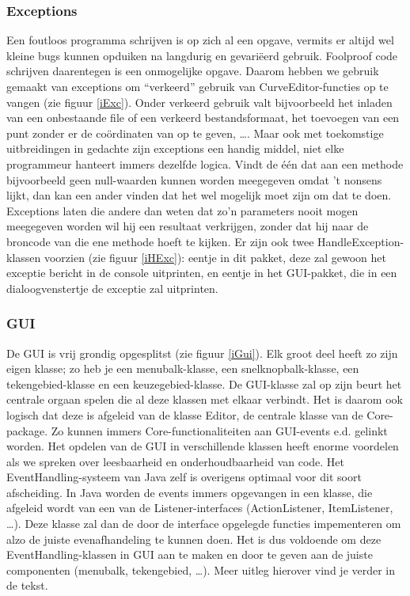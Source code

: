 \documentclass[a4paper,11pt,oneside, titlepage]{article}
\begin{document}
\subsubsection{Exceptions}
Een foutloos programma schrijven is op zich al een opgave, vermits er altijd wel kleine bugs
kunnen opduiken na langdurig en gevari\"eerd gebruik. Foolproof code schrijven daarentegen is een
onmogelijke opgave. Daarom hebben we gebruik gemaakt van exceptions om ``verkeerd'' gebruik van
CurveEditor-functies op te vangen (zie figuur \ref{iExc}). Onder verkeerd gebruik valt bijvoorbeeld het inladen van een
onbestaande file of een verkeerd bestandsformaat, het toevoegen van een punt zonder er de 
co\"ordinaten van op te geven, \ldots. Maar ook met toekomstige uitbreidingen in gedachte zijn exceptions een handig middel,
niet elke programmeur hanteert immers dezelfde logica. Vindt de \'e\'en dat aan een methode bijvoorbeeld geen null-waarden kunnen worden meegegeven omdat 't nonsens lijkt, dan kan een ander vinden dat het wel mogelijk moet zijn om dat te doen. Exceptions laten die andere dan weten dat zo'n parameters nooit mogen meegegeven worden wil hij een resultaat verkrijgen, zonder dat hij naar de broncode van die ene methode hoeft te kijken.\newline \newline
Er zijn ook twee HandleException-klassen voorzien (zie figuur \ref{iHExc}): eentje in dit pakket, deze zal gewoon 
het exceptie bericht in de console uitprinten, en eentje in het GUI-pakket, die in een dialoogvenstertje de exceptie zal uitprinten.
\subsubsection{GUI}
De GUI is vrij grondig opgesplitst (zie figuur \ref{iGui}). Elk groot deel heeft zo zijn eigen klasse; 
zo heb je een menubalk-klasse, een snelknopbalk-klasse, een tekengebied-klasse en een keuzegebied-klasse. \newline
De GUI-klasse zal op zijn beurt het centrale orgaan spelen die al deze klassen met elkaar verbindt.
Het is daarom ook logisch dat deze is afgeleid van de klasse Editor,
de centrale klasse van de Core-package. Zo kunnen immers Core-functionaliteiten aan GUI-events e.d. gelinkt worden.
\newline
Het opdelen van de GUI in verschillende klassen heeft enorme voordelen als we spreken 
over leesbaarheid en onderhoudbaarheid van code. Het EventHandling-systeem van Java zelf is overigens
optimaal voor dit soort afscheiding. In Java worden de events immers opgevangen in een klasse,
die afgeleid wordt van een van de Listener-interfaces (ActionListener, ItemListener, \ldots). Deze 
klasse zal dan de door de interface opgelegde functies impementeren om alzo de juiste evenafhandeling te kunnen
doen. Het is dus voldoende om deze EventHandling-klassen in GUI aan te maken en door te geven
aan de juiste componenten (menubalk, tekengebied, \ldots). Meer uitleg hierover vind je verder in
de tekst.
\end{document}
